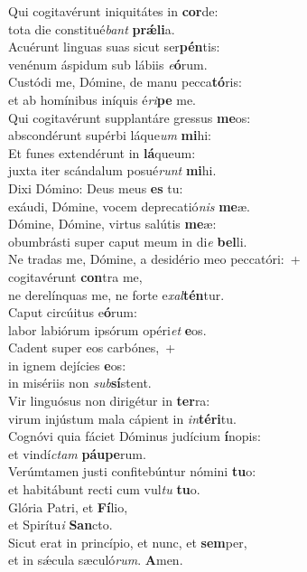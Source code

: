 \evenverse Qui cogitavérunt iniquitátes in \textbf{cor}de:~\*\\
\evenverse tota die constitué\textit{bant} \textbf{prǽ}\textbf{li}a.\\
\oddverse Acuérunt linguas suas sicut ser\textbf{pén}tis:~\*\\
\oddverse venénum áspidum sub lábiis \textit{e}\textbf{ó}rum.\\
\evenverse Custódi me, Dómine, de manu pecca\textbf{tó}ris:~\*\\
\evenverse et ab homínibus iníquis é\textit{ri}\textbf{pe} me.\\
\oddverse Qui cogitavérunt supplantáre gressus \textbf{me}os:~\*\\
\oddverse abscondérunt supérbi láque\textit{um} \textbf{mi}hi:\\
\evenverse Et funes extendérunt in \textbf{lá}queum:~\*\\
\evenverse juxta iter scándalum posué\textit{runt} \textbf{mi}hi.\\
\oddverse Dixi Dómino: Deus meus \textbf{es} tu:~\*\\
\oddverse exáudi, Dómine, vocem deprecatió\textit{nis} \textbf{me}æ.\\
\evenverse Dómine, Dómine, virtus salútis \textbf{me}æ:~\*\\
\evenverse obumbrásti super caput meum in di\textit{e} \textbf{bel}li.\\
\oddverse Ne tradas me, Dómine, a desidério meo peccatóri:~+\\
\oddverse  cogitavérunt \textbf{con}tra me,~\*\\
\oddverse ne derelínquas me, ne forte e\textit{xal}\textbf{tén}tur.\\
\evenverse Caput circúitus e\textbf{ó}rum:~\*\\
\evenverse labor labiórum ipsórum opéri\textit{et} \textbf{e}os.\\
\oddverse Cadent super eos carbónes,~+\\
\oddverse  in ignem dejícies \textbf{e}os:~\*\\
\oddverse in misériis non \textit{sub}\textbf{sí}stent.\\
\evenverse Vir linguósus non dirigétur in \textbf{ter}ra:~\*\\
\evenverse virum injústum mala cápient in \textit{in}\textbf{té}\textbf{ri}tu.\\
\oddverse Cognóvi quia fáciet Dóminus judícium \textbf{í}nopis:~\*\\
\oddverse et vindí\textit{ctam} \textbf{páu}\textbf{pe}rum.\\
\evenverse Verúmtamen justi confitebúntur nómini \textbf{tu}o:~\*\\
\evenverse et habitábunt recti cum vul\textit{tu} \textbf{tu}o.\\
\oddverse Glória Patri, et \textbf{Fí}lio,~\*\\
\oddverse et Spirítu\textit{i} \textbf{San}cto.\\
\evenverse Sicut erat in princípio, et nunc, et \textbf{sem}per,~\*\\
\evenverse et in sǽcula sæculó\textit{rum}. \textbf{A}men.\\
